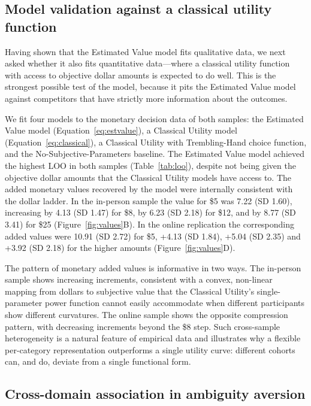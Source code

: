 \documentclass[11pt]{article}
\begin{document}
\subsection{Model validation against a classical utility function}

Having shown that the Estimated Value model fits qualitative data, we next asked whether it also fits quantitative data---where a classical utility function with access to objective dollar amounts is expected to do well. This is the strongest possible test of the model, because it pits the Estimated Value model against competitors that have strictly more information about the outcomes.

We fit four models to the monetary decision data of both samples: the Estimated Value model (Equation~\ref{eq:estvalue}), a Classical Utility model (Equation~\ref{eq:classical}), a Classical Utility with Trembling-Hand choice function, and the No-Subjective-Parameters baseline. The Estimated Value model achieved the highest LOO in both samples (Table~\ref{tab:loo}), despite not being given the objective dollar amounts that the Classical Utility models have access to. The added monetary values recovered by the model were internally consistent with the dollar ladder. In the in-person sample the value for \$5 was 7.22 (SD 1.60), increasing by 4.13 (SD 1.47) for \$8, by 6.23 (SD 2.18) for \$12, and by 8.77 (SD 3.41) for \$25 (Figure~\ref{fig:values}B). In the online replication the corresponding added values were 10.91 (SD 2.72) for \$5, +4.13 (SD 1.84), +5.04 (SD 2.35) and +3.92 (SD 2.18) for the higher amounts (Figure~\ref{fig:values}D).

The pattern of monetary added values is informative in two ways. The in-person sample shows increasing increments, consistent with a convex, non-linear mapping from dollars to subjective value that the Classical Utility's single-parameter power function cannot easily accommodate when different participants show different curvatures. The online sample shows the opposite compression pattern, with decreasing increments beyond the \$8 step. Such cross-sample heterogeneity is a natural feature of empirical data and illustrates why a flexible per-category representation outperforms a single utility curve: different cohorts can, and do, deviate from a single functional form.

\subsection{Cross-domain association in ambiguity aversion}
\end{document}
